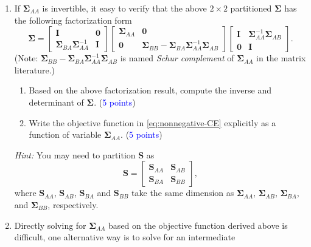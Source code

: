 \documentclass[english,onecolumn]{IEEEtran}
\begin{document}
\begin{enumerate}
\item If $\boldsymbol{\Sigma}_{AA}$ is invertible, it easy to verify that
the above $2\times2$ partitioned $\bm{\Sigma}$ has the following
factorization form
\begin{equation}
\bm{\Sigma}=\left[\begin{array}{cc}
\mathbf{I} & \mathbf{0}\\
\boldsymbol{\Sigma}_{BA}\boldsymbol{\Sigma}_{AA}^{-1} & \mathbf{I}
\end{array}\right]\left[\begin{array}{cc}
\boldsymbol{\Sigma}_{AA} & \mathbf{0}\\
\mathbf{0} & \bm{\Sigma}_{BB}-\bm{\Sigma}_{BA}\bm{\Sigma}_{AA}^{-1}\bm{\Sigma}_{AB}
\end{array}\right]\left[\begin{array}{cc}
\mathbf{I} & \boldsymbol{\Sigma}_{AA}^{-1}\boldsymbol{\Sigma}_{AB}\\
\mathbf{0} & \mathbf{I}
\end{array}\right].\label{eq:factorize}
\end{equation}
(Note: $\bm{\Sigma}_{BB}-\bm{\Sigma}_{BA}\bm{\Sigma}_{AA}^{-1}\bm{\Sigma}_{AB}$
is named \emph{Schur complement} of $\boldsymbol{\Sigma}_{AA}$ in
the matrix literature.) 
\begin{enumerate}
\item Based on the above factorization result, compute the inverse and determinant
of $\boldsymbol{\Sigma}$. (\textcolor{blue}{5 points})
\item Write the objective function in \eqref{eq:nonnegative-CE} explicitly
as a function of variable $\boldsymbol{\Sigma}_{AA}$. (\textcolor{blue}{5 points})
\end{enumerate}
\emph{Hint: }You may need to partition $\mathbf{S}$ as
\[
\mathbf{S}=\left[\begin{array}{cc}
\mathbf{S}_{AA} & \mathbf{S}_{AB}\\
\mathbf{S}_{BA} & \mathbf{S}_{BB}
\end{array}\right],
\]
where $\mathbf{S}_{AA}$, $\mathbf{S}_{AB}$, $\mathbf{S}_{BA}$ and
$\mathbf{S}_{BB}$ take the same dimension as $\boldsymbol{\Sigma}_{AA}$,
$\boldsymbol{\Sigma}_{AB}$, $\boldsymbol{\Sigma}_{BA}$, and $\boldsymbol{\Sigma}_{BB}$,
respectively.
\item Directly solving for $\boldsymbol{\Sigma}_{AA}$ based on the objective
function derived above is difficult, one alternative way is to solve for an intermediate

\end{enumerate}
\end{document}
